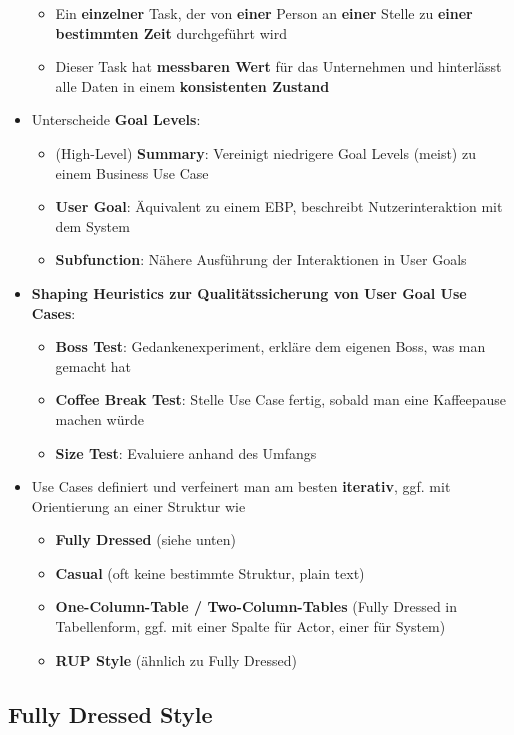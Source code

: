 \begin{itemize}
	\begin{itemize}
		\item Ein \textbf{einzelner} Task, der von \textbf{einer} Person an \textbf{einer} Stelle zu \textbf{einer bestimmten Zeit} durchgeführt wird
		\item Dieser Task hat \textbf{messbaren Wert} für das Unternehmen und hinterlässt alle Daten in einem \textbf{konsistenten Zustand}
	\end{itemize}
	\item Unterscheide \textbf{Goal Levels}:
	\begin{itemize}
		\item (High-Level) \textbf{Summary}: Vereinigt niedrigere Goal Levels (meist) zu einem Business Use Case
		\item \textbf{User Goal}: Äquivalent zu einem EBP, beschreibt Nutzerinteraktion mit dem System
		\item \textbf{Subfunction}: Nähere Ausführung der Interaktionen in User Goals
	\end{itemize}
	\item \textbf{Shaping Heuristics zur Qualitätssicherung von User Goal Use Cases}:
	\begin{itemize}
		\item \textbf{Boss Test}: Gedankenexperiment, erkläre dem eigenen Boss, was man gemacht hat
		\item \textbf{Coffee Break Test}: Stelle Use Case fertig, sobald man eine Kaffeepause machen würde
		\item \textbf{Size Test}: Evaluiere anhand des Umfangs
	\end{itemize}
	\item Use Cases definiert und verfeinert man am besten \textbf{iterativ}, ggf. mit Orientierung an einer Struktur wie
	\begin{itemize}
		\item \textbf{Fully Dressed} (siehe unten)
		\item \textbf{Casual} (oft keine bestimmte Struktur, plain text)
		\item \textbf{One-Column-Table / Two-Column-Tables} (Fully Dressed in Tabellenform, ggf. mit einer Spalte für Actor, einer für System)
		\item \textbf{RUP Style} (ähnlich zu Fully Dressed)
	\end{itemize}
\end{itemize}

\subsection{Fully Dressed Style}
\label{uc:sub:fully_dressed_style}

